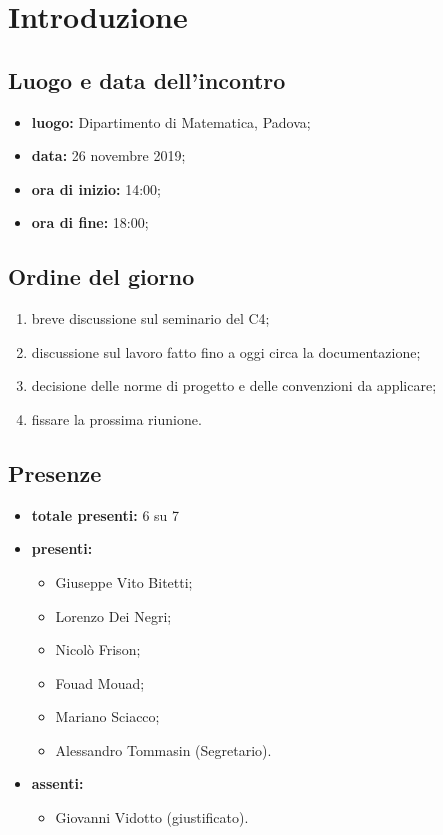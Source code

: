 \section*{Introduzione}

\subsection*{Luogo e data dell'incontro}
	\begin{itemize}
		\item \textbf{luogo:} Dipartimento di Matematica, Padova;
		\item \textbf{data:} 26 novembre 2019;
		\item \textbf{ora di inizio:} 14:00;
		\item \textbf{ora di fine:} 18:00;

	\end{itemize}

\subsection*{Ordine del giorno}
	\begin{enumerate}

		\item breve discussione sul seminario del  C4;
		\item discussione sul lavoro fatto fino a oggi circa la documentazione;
		\item decisione delle norme di progetto e delle convenzioni da applicare;
		\item fissare la prossima riunione.

	\end{enumerate}

\subsection*{Presenze}
	\begin{itemize}
		\item \textbf{totale presenti:} 6 su 7
		\item \textbf{presenti: }
			\begin{itemize}
				\item Giuseppe Vito Bitetti;
				\item Lorenzo Dei Negri;
				\item Nicolò Frison;
				\item Fouad Mouad;
				\item Mariano Sciacco;
				\item Alessandro Tommasin (Segretario).
			\end{itemize}
		\item \textbf{assenti: } 
			\begin{itemize}	
				\item Giovanni Vidotto (giustificato).
			\end{itemize}
	\end{itemize}


